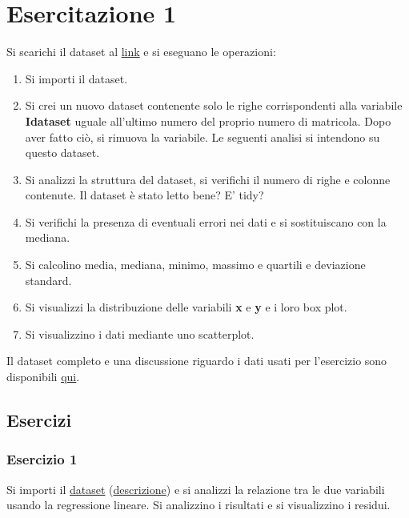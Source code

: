 \documentclass[]{book}
\providecommand{\tightlist}{%
  \setlength{\itemsep}{0pt}\setlength{\parskip}{0pt}}
\begin{document}
\hypertarget{esercitazione-1}{%
\chapter{Esercitazione 1}\label{esercitazione-1}}

Si scarichi il dataset al \href{https://www.dropbox.com/s/8uoacrlaeio1hy3/DataL5.tsv?dl=1}{link} e si eseguano le operazioni:

\begin{enumerate}
\def\labelenumi{\arabic{enumi}.}
\tightlist
\item
  Si importi il dataset.
\item
  Si crei un nuovo dataset contenente solo le righe corrispondenti alla variabile \textbf{Idataset} uguale all'ultimo numero del proprio numero di matricola. Dopo aver fatto ciò, si rimuova la variabile. Le seguenti analisi si intendono su questo dataset.
\item
  Si analizzi la struttura del dataset, si verifichi il numero di righe e colonne contenute. Il dataset è stato letto bene? E' tidy?
\item
  Si verifichi la presenza di eventuali errori nei dati e si sostituiscano con la mediana.
\item
  Si calcolino media, mediana, minimo, massimo e quartili e deviazione standard.
\item
  Si visualizzi la distribuzione delle variabili \textbf{x} e \textbf{y} e i loro box plot.
\item
  Si visualizzino i dati mediante uno scatterplot.
\end{enumerate}

Il dataset completo e una discussione riguardo i dati usati per l'esercizio sono disponibili \href{https://www.autodeskresearch.com/publications/samestats}{qui}.

\hypertarget{esercizi-3}{%
\section{Esercizi}\label{esercizi-3}}

\hypertarget{esercizio-1-3}{%
\subsection{Esercizio 1}\label{esercizio-1-3}}

Si importi il \href{https://www.dropbox.com/s/boesoonvh04nqym/Gray_Kangaroos.tsv?dl=1}{dataset} (\href{http://college.cengage.com/mathematics/brase/understandable_statistics/7e/students/datasets/slr/frames/frame.html}{descrizione}) e si analizzi la relazione tra le due variabili usando la regressione lineare. Si analizzino i risultati e si visualizzino i residui.
\end{document}
